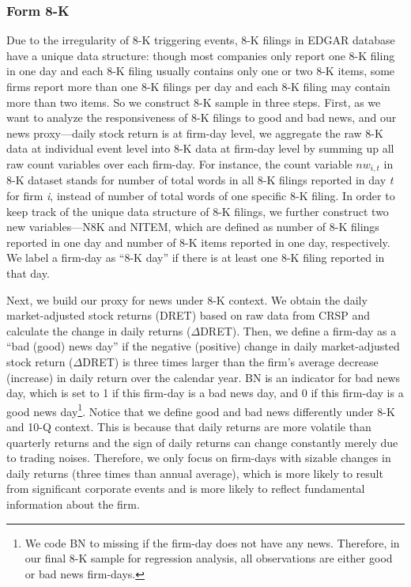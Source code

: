 \documentclass[a4paper]{article}
\begin{document}
\begin{spacing}{2}
\subsubsection{Form 8-K}
Due to the irregularity of 8-K triggering events, 8-K filings in EDGAR database have a unique data structure: though most companies only report one 8-K filing in one day and each 8-K filing usually contains only one or two 8-K items, some firms report more than one 8-K filings per day and each 8-K filing may contain more than two items. So we construct 8-K sample in three steps. First, as we want to analyze the responsiveness of 8-K filings to good and bad news, and our news proxy---daily stock return is at firm-day level, we aggregate the raw 8-K data at individual event level into 8-K data at firm-day level by summing up all raw count variables over each firm-day. For instance, the count variable $nw_{i,t}$ in 8-K dataset stands for number of total words in all 8-K filings reported in day \textit{t} for firm \textit{i}, instead of number of total words of one specific 8-K filing. In order to keep track of the unique data structure of 8-K filings, we further construct two new variables---N8K and NITEM, which are defined as number of 8-K filings reported in one day and number of 8-K items reported in one day, respectively. We label a firm-day as “8-K day” if there is at least one 8-K filing reported in that day.

Next, we build our proxy for news under 8-K context. We obtain the daily market-adjusted stock returns (DRET) based on raw data from CRSP and calculate the change in daily returns ($\Delta$DRET). Then, we define a firm-day as a “bad (good) news day” if the negative (positive) change in daily market-adjusted stock return ($\Delta$DRET) is three times larger than the firm's average decrease (increase) in daily return over the calendar year. BN is an indicator for bad news day, which is set to 1 if this firm-day is a bad news day, and 0 if this firm-day is a good news day\footnote{We code BN to missing if the firm-day does not have any news. Therefore, in our final 8-K sample for regression analysis, all observations are either good or bad news firm-days.}. Notice that we define good and bad news differently under 8-K and 10-Q context. This is because that daily returns are more volatile than quarterly returns and the sign of daily returns can change constantly merely due to trading noises. Therefore, we only focus on firm-days with sizable changes in daily returns (three times than annual average), which is more likely to result from significant corporate events and is more likely to reflect fundamental information about the firm.


\end{spacing}
\end{document}
